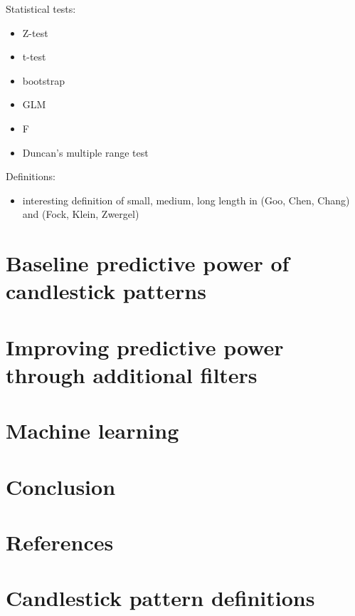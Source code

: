 \documentclass[
  12pt,
  a4paper,
  oneside]{book}
\providecommand{\tightlist}{%
  \setlength{\itemsep}{0pt}\setlength{\parskip}{0pt}}
\begin{document}
Statistical tests:

\begin{itemize}
\item
  Z-test
\item
  t-test
\item
  bootstrap
\item
  GLM
\item
  F
\item
  Duncan's multiple range test
\end{itemize}

Definitions:

\begin{itemize}
\tightlist
\item
  interesting definition of small, medium, long length in (Goo, Chen, Chang) and (Fock, Klein, Zwergel)
\end{itemize}

\chapter{Baseline predictive power of candlestick patterns}\label{baseline-predictive-power-of-candlestick-patterns}

\chapter{Improving predictive power through additional filters}\label{improving-predictive-power-through-additional-filters}

\chapter{Machine learning}\label{machine-learning}

\chapter{Conclusion}\label{conclusion}

\chapter{References}\label{references}

\appendix


\chapter{Candlestick pattern definitions}\label{candlestick-pattern-definitions}
\end{document}

